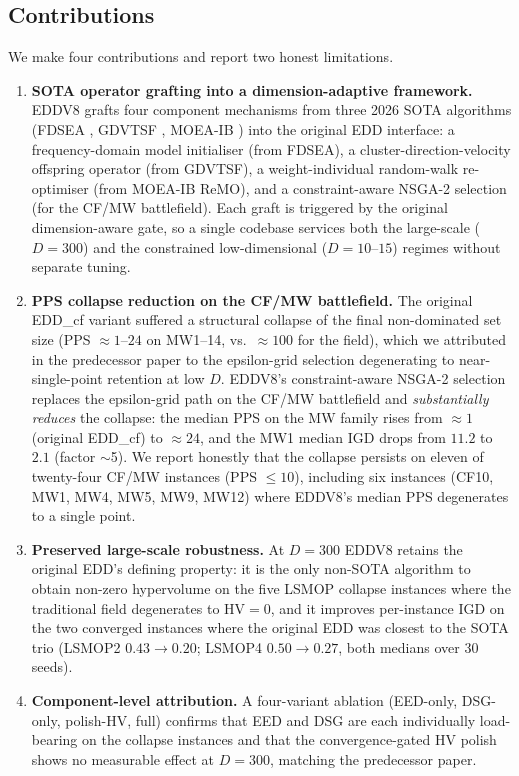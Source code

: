 \documentclass[preprint,12pt]{elsarticle}
\begin{document}
\subsection{Contributions}

We make four contributions and report two honest limitations.

\begin{enumerate}
\item \textbf{SOTA operator grafting into a dimension-adaptive framework.}
EDDV8 grafts four component mechanisms from three 2026 SOTA algorithms
(FDSEA \cite{fdsea2026}, GDVTSF \cite{gdvtsf2026}, MOEA-IB
\cite{moaib2026}) into the original EDD interface: a frequency-domain
model initialiser (from FDSEA), a cluster-direction-velocity offspring
operator (from GDVTSF), a weight-individual random-walk re-optimiser
(from MOEA-IB ReMO), and a constraint-aware NSGA-2 selection (for the
CF/MW battlefield). Each graft is triggered by the original dimension-aware
gate, so a single codebase services both the large-scale ($D=300$) and the
constrained low-dimensional ($D=10$--$15$) regimes without separate
tuning.

\item \textbf{PPS collapse reduction on the CF/MW battlefield.}
The original EDD\_cf variant suffered a structural collapse of the final
non-dominated set size (PPS $\approx 1$--$24$ on MW1--14, vs.\
$\approx 100$ for the field), which we attributed in the predecessor paper
to the epsilon-grid selection degenerating to near-single-point retention
at low $D$. EDDV8's constraint-aware NSGA-2 selection replaces the
epsilon-grid path on the CF/MW battlefield and \emph{substantially reduces}
the collapse: the median PPS on the MW family rises from $\approx 1$
(original EDD\_cf) to $\approx 24$, and the MW1 median IGD drops from $11.2$
to $2.1$ (factor $\sim$5). We report honestly that the collapse persists on
eleven of twenty-four CF/MW instances (PPS $\le 10$), including six
instances (CF10, MW1, MW4, MW5, MW9, MW12) where EDDV8's median PPS
degenerates to a single point.

\item \textbf{Preserved large-scale robustness.}
At $D=300$ EDDV8 retains the original EDD's defining property: it is the
only non-SOTA algorithm to obtain non-zero hypervolume on the five
LSMOP collapse instances where the traditional field degenerates to
$\mathrm{HV} = 0$, and it improves per-instance IGD on the two
converged instances where the original EDD was closest to the SOTA trio
(LSMOP2 $0.43 \to 0.20$; LSMOP4 $0.50 \to 0.27$, both medians over 30
seeds).

\item \textbf{Component-level attribution.}
A four-variant ablation (EED-only, DSG-only, polish-HV, full) confirms
that EED and DSG are each individually load-bearing on the collapse
instances and that the convergence-gated HV polish shows no measurable
effect at $D=300$, matching the predecessor paper.
\end{enumerate}
\end{document}
